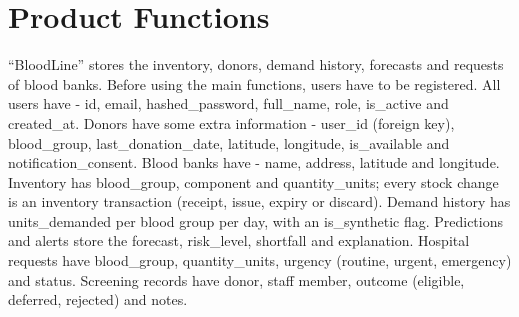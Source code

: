 \documentclass{scrreprt}
\begin{document}
\section{Product Functions}
``BloodLine'' stores the inventory, donors, demand history, forecasts and requests of blood banks. Before using the main functions, users have to be registered.
\newline
All users have - id, email, hashed\_password, full\_name, role, is\_active and created\_at.
\newline
Donors have some extra information - user\_id (foreign key), blood\_group, last\_donation\_date, latitude, longitude, is\_available and notification\_consent.
\newline
Blood banks have - name, address, latitude and longitude. Inventory has blood\_group, component and quantity\_units; every stock change is an inventory transaction (receipt, issue, expiry or discard).
\newline
Demand history has units\_demanded per blood group per day, with an is\_synthetic flag. Predictions and alerts store the forecast, risk\_level, shortfall and explanation.
\newline
Hospital requests have blood\_group, quantity\_units, urgency (routine, urgent, emergency) and status. Screening records have donor, staff member, outcome (eligible, deferred, rejected) and notes.
\end{document}

